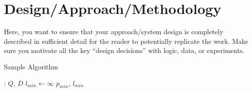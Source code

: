 \section{Design/Approach/Methodology} 
Here, you want to ensure that your approach/system design is completely described in sufficient detail for the reader to potentially replicate the work. Make sure you motivate all the key ``design decisions'' with logic, data, or experiments.

\begin{algorithm}[t]
\label{algo:tom}
\caption{Sample Algorithm~\cite{sonata}}
\Input: $Q$, $D$\;
$l_{min} \gets \infty$\;
\Return $p_{min}$, $l_{min}$

\end{algorithm}